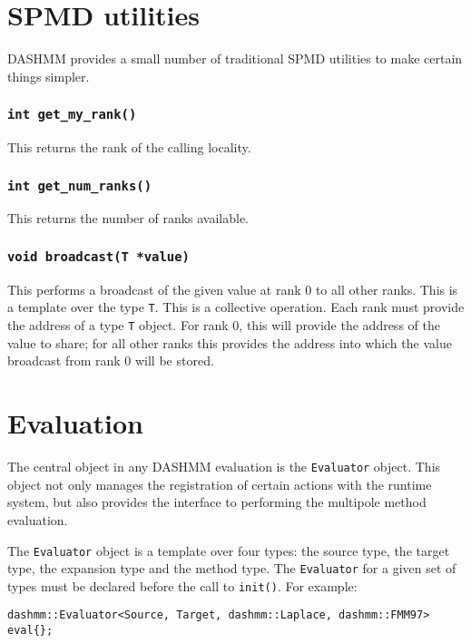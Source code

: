 \section{SPMD utilities}

DASHMM provides a small number of traditional SPMD utilities to make certain
things simpler.

\subsubsection{\texttt{int get\_my\_rank()}}

This returns the rank of the calling locality.

\subsubsection{\texttt{int get\_num\_ranks()}}

This returns the number of ranks available.

\subsubsection{\texttt{void broadcast(T *value)}}

This performs a broadcast of the given value at rank 0 to all other ranks.
This is a template over the type \texttt{T}. This is a collective operation.
Each rank must provide the address of a type \texttt{T} object. For rank 0,
this will provide  the address of the value to share; for all other ranks
this provides the address into which the value broadcast from rank 0 will be
stored.

\section{Evaluation}

The central object in any DASHMM evaluation is the \texttt{Evaluator} object.
This object not only manages the registration of certain actions with the
runtime system, but also provides the interface to performing the multipole
method evaluation.

The \texttt{Evaluator} object is a template over four types: the source type,
the target type, the expansion type and the method type. The \texttt{Evaluator}
for a given set of types must be declared before the call to \texttt{init()}.
For example:

\begin{verbatim}
dashmm::Evaluator<Source, Target, dashmm::Laplace, dashmm::FMM97> eval{};
\end{verbatim}

